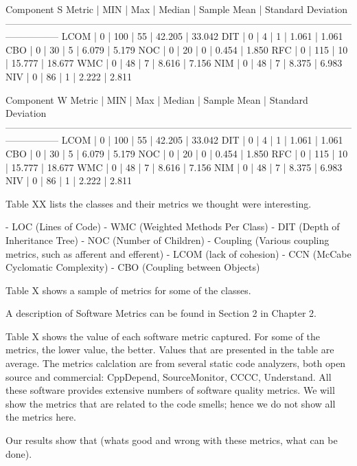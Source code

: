 Component S
Metric		|		MIN 		|		Max 		| 		Median 		| 		Sample Mean 		| 		Standard Deviation
-----------------------------------------------------------------------------------------------------------------------------
LCOM		|		0			|		100			|		55			|		42.205				|		33.042
DIT 		|		0			|		4			|		1			|		1.061				|		1.061
CBO 		|		0			|		30			|		5			|		6.079				|		5.179
NOC 		|		0			|		20			|		0			|		0.454				|		1.850
RFC 		|		0			|		115			|		10 			|		15.777				|		18.677
WMC 		|		0			|		48			|		7			|		8.616				|		7.156
NIM			|		0			|		48			|		7			|		8.375				|		6.983
NIV 		|		0			|		86			|		1 			|		2.222				|		2.811






Component W
Metric		|		MIN 		|		Max 		| 		Median 		| 		Sample Mean 		| 		Standard Deviation
-----------------------------------------------------------------------------------------------------------------------------
LCOM		|		0			|		100			|		55			|		42.205				|		33.042
DIT 		|		0			|		4			|		1			|		1.061				|		1.061
CBO 		|		0			|		30			|		5			|		6.079				|		5.179
NOC 		|		0			|		20			|		0			|		0.454				|		1.850
RFC 		|		0			|		115			|		10 			|		15.777				|		18.677
WMC 		|		0			|		48			|		7			|		8.616				|		7.156
NIM			|		0			|		48			|		7			|		8.375				|		6.983
NIV 		|		0			|		86			|		1 			|		2.222				|		2.811


Table XX lists the classes and their metrics we thought were interesting. 


- LOC (Lines of Code)
- WMC (Weighted Methods Per Class)
- DIT (Depth of Inheritance Tree)
- NOC (Number of Children)
- Coupling (Various coupling metrics, such as afferent and efferent)
- LCOM (lack of cohesion)
- CCN (McCabe Cyclomatic Complexity)
- CBO (Coupling between Objects)

Table X shows a sample of metrics for some of the classes. 


A description of Software Metrics can be found in Section 2 in Chapter 2. 

Table X shows the value of each software metric captured. For some of the metrics, the lower value, the better. Values that are presented in the table are average. The metrics calclation are from several static code analyzers, both open source and commercial: CppDepend, SourceMonitor, CCCC, Understand. All these software provides extensive numbers of software quality metrics. We will show the metrics that are related to the code smells; hence we do not show all the metrics here. 

Our results show that (whats good and wrong with these metrics, what can be done). 


